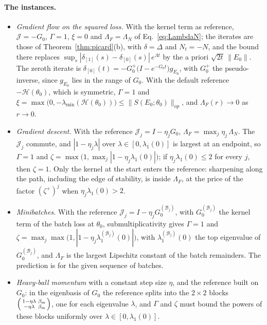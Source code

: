 \documentclass[11pt]{article}
\theoremstyle{definition}
\theoremstyle{remark}
\newcommand{\Hess}{\mathcal{H}}          %
\begin{document}
\paragraph{The instances.}
\begin{itemize}
\item \emph{Gradient flow on the squared loss.} With the kernel term as reference, $\mathcal{J} = -G_0$, $\Gamma = 1$, $\xi = 0$ and $\Lambda_F = \Lambda_N$ of Eq.~\eqref{eq:LambdaN}; the iterates are those of Theorem~\ref{thm:picard}(b), with $\delta = \Delta$ and $N_t = -N$, and the bound there replaces $\sup_s|\delta_{[1]}(s) - \delta_{[0]}(s)|\,e^{\Lambda t}$ by the a priori $\sqrt{2t}\,\|E_0\|$.
The zeroth iterate is $\delta_{[0]}(t) = -G_0^{+}\big(I - e^{-G_0t}\big)g_{E_0}$, with $G_0^+$ the pseudo-inverse, since $g_{E_0}$ lies in the range of $G_0$.
With the default reference $-\Hess(\theta_0)$, which is symmetric, $\Gamma = 1$ and $\xi = \max\big(0, -\lambda_{\min}(\Hess(\theta_0))\big)\le\|S(E_0;\theta_0)\|_{op}$, and $\Lambda_F(r)\to0$ as $r\to0$.
\item \emph{Gradient descent.} With the reference $\mathcal{J}_j = I - \eta_jG_0$, $\Lambda_F = \max_j\eta_j\,\Lambda_N$.
The $\mathcal{J}_j$ commute, and $|1 - \eta_j\lambda|$ over $\lambda\in[0,\lambda_1(0)]$ is largest at an endpoint, so $\Gamma = 1$ and $\zeta = \max\big(1, \max_j|1 - \eta_j\lambda_1(0)|\big)$; if $\eta_j\lambda_1(0)\le2$ for every $j$, then $\zeta = 1$.
Only the kernel at the start enters the reference: sharpening along the path, including the edge of stability, is inside $\Lambda_F$, at the price of the factor $(\zeta^+)^j$ when $\eta_j\lambda_1(0) > 2$.
\item \emph{Minibatches.} With the reference $\mathcal{J}_j = I - \eta_jG_0^{(\mathcal{B}_j)}$, with $G_0^{(\mathcal{B}_j)}$ the kernel term of the batch loss at $\theta_0$, submultiplicativity gives $\Gamma = 1$ and $\zeta = \max_j\max\big(1, |1 - \eta_j\lambda_1^{(\mathcal{B}_j)}(0)|\big)$, with $\lambda_1^{(\mathcal{B}_j)}(0)$ the top eigenvalue of $G_0^{(\mathcal{B}_j)}$, and $\Lambda_F$ is the largest Lipschitz constant of the batch remainders.
The prediction is for the given sequence of batches.
\item \emph{Heavy-ball momentum} with a constant step size $\eta$, and the reference built on $G_0$: in the eigenbasis of $G_0$ the reference splits into the $2\times2$ blocks $\begin{psmallmatrix}1 - \eta\lambda & \beta_{\mathrm m}\\ -\eta\lambda & \beta_{\mathrm m}\end{psmallmatrix}$, one for each eigenvalue $\lambda$, and $\Gamma$ and $\zeta$ must bound the powers of these blocks uniformly over $\lambda\in[0,\lambda_1(0)]$.

\end{itemize}
\end{document}
